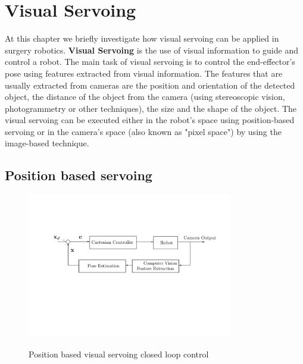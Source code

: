 \section{Visual Servoing}

At this chapter we briefly investigate how visual servoing can be applied in surgery robotics. \textbf{Visual Servoing} is the use of visual information 
to guide and control a robot. The main task of visual servoing is to control the end-effector's pose using features extracted from visual information. The 
features that are usually extracted from cameras are the position and orientation of the detected object, the distance of the object from the camera (using 
stereoscopic vision, photogrammetry or other techniques), the size and the shape of the object. The visual servoing can be executed either in the robot's space 
using position-based servoing or in the camera's space (also known as "pixel space") by using the image-based technique.

\subsection{Position based servoing}

\begin{center}
\begin{figure}[!htb]
\centering
\includegraphics[width=0.8\textwidth]{images/visual-servoing-position-based.png}\\
\caption{Position based visual servoing closed loop control}
\end{figure}
\end{center}

